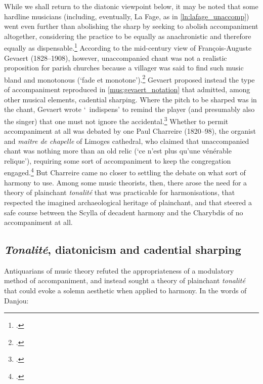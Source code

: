 %
While we shall return to the diatonic viewpoint below, it may be noted that some hardline musicians (including, eventually, La Fage, as in \cref{ln:lafage_unaccomp}) went even further than abolishing the sharp by seeking to abolish accompaniment altogether, considering the practice to be equally as anachronistic and therefore equally as dispensable.\footcite[141]{LaFagereproductionlivresplainchant1853}
According to the mid-century view of François-Auguste Gevaert (1828--1908), however, unaccompanied chant was not a realistic proposition for parish churches because a villager was said to find such music bland and monotonous (`fade et monotone').\footcite[Cited in][187]{LessmannRezeptiongregorianischenChorals2016}
%
Gevaert proposed instead the type of accompaniment reproduced in \cref{mus:gevaert_notation} that admitted, among other musical elements, cadential sharping.
Where the pitch to be sharped was in the chant, Gevaert wrote `\sharp{}~indispens' to remind the player (and presumably also the singer) that one must not ignore the accidental.\footcite[21, 44]{GevaertMethodepourenseignement1856}
%
Whether to permit accompaniment at all was debated by one Paul Charreire (1820--98), the organist and \emph{maître de chapelle} of Limoges cathedral, who claimed that unaccompanied chant was nothing more than an old relic (`ce n'est plus qu'une vénérable relique'), requiring some sort of accompaniment to keep the congregation engaged.\footcite[38]{Congrespourrestauration1862}
But Charreire came no closer to settling the debate on what sort of harmony to use.
Among some music theorists, then, there arose the need for a theory of plainchant \emph{tonalité} that was practicable for harmonisations, that respected the imagined archaeological heritage of plainchant, and that steered a safe course between the Scylla of decadent harmony and the Charybdis of no accompaniment at all.
\pagebreak{}

\subsection{\emph{Tonalité}, diatonicism and cadential sharping}
Antiquarians of music theory refuted the appropriateness of a modulatory method of accompaniment, and instead sought a theory of plainchant \emph{tonalité} that could evoke a solemn aesthetic when applied to harmony.
In the words of Danjou:

